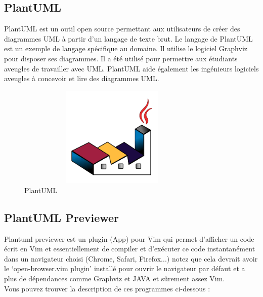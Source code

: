 \documentclass[12pt]{report}
\begin{document}
\vspace{-0.1in}
\subsection{PlantUML}
PlantUML est un outil open source permettant aux utilisateurs de cr\'eer des diagrammes UML \`a partir d'un langage de texte brut. Le langage de PlantUML est un exemple de langage sp\'ecifique au domaine. Il utilise le logiciel Graphviz pour disposer ses diagrammes. Il a \'et\'e utilis\'e pour permettre aux \'etudiants aveugles de travailler avec UML\@. PlantUML aide \'egalement les ing\'enieurs logiciels aveugles \`a concevoir et lire des diagrammes UML\@.

\vspace{-0.2in}

\begin{figure}[h]
\centering
    \includegraphics[width = 3.6in, height = 1.9in]{../Images/plantuml.png}
\vspace{-0.1in}
\caption{PlantUML}
\end{figure}

\newpage

\subsection{PlantUML Previewer}
Plantuml previewer est un plugin (App) pour Vim qui permet d'afficher un code écrit en Vim et essentiellement de compiler et d'exécuter ce code instantanément dans un navigateur choisi (Chrome, Safari, Firefox...) notez que cela devrait avoir le `open-browser.vim  plugin' installé pour ouvrir le navigateur par défaut et a plus de dépendances comme Graphviz et JAVA et sûrement assez Vim.
\\
Vous pouvez trouver la description de ces programmes ci-dessous :

\vspace{0.05in}
\end{document}
